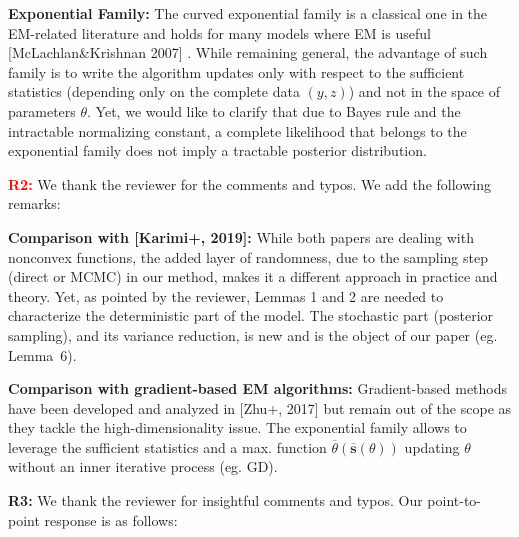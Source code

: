 \documentclass{article}
\begin{document}
\textbf{Exponential Family:} 
The curved exponential family is a classical one in the EM-related literature and holds for many models where  EM is useful [McLachlan\&Krishnan 2007] . 
While remaining general, the advantage of such family is to write the algorithm updates only with respect to the sufficient statistics (depending only on the complete data $(y,z)$) and not in the space of parameters $\theta$. 
Yet, we would like to clarify that due to Bayes rule and the intractable normalizing constant, a complete likelihood that belongs to the exponential family does not imply a tractable posterior distribution.


\textbf{\textcolor{red}{R2:}} We thank the reviewer for the comments and typos. We add the following remarks:\vspace{-5pt}

\textbf{Comparison with [Karimi+, 2019]:} 
While both papers are dealing with nonconvex functions, the added layer of randomness, due to the sampling step (direct or MCMC) in our method, makes it a different approach in practice and theory.
Yet, as pointed by the reviewer, Lemmas 1 and 2 are needed to characterize the deterministic part of the model. 
The stochastic part (posterior sampling), and its variance reduction, is new and is the object of our paper (eg. Lemma~6).\vspace{-5pt}

\textbf{Comparison with gradient-based EM algorithms:} 
Gradient-based methods have been developed and analyzed in [Zhu+, 2017] but remain out of the scope as they tackle the high-dimensionality issue. 
The exponential family allows to leverage the sufficient statistics and a max. function $ \overline{\theta}( \overline{\textbf{s}}(\theta) )$ updating $\theta$ without an inner iterative process (eg. GD).


\textbf{\textcolor{green!50!black}{R3:}} We thank the reviewer for insightful comments and typos. Our point-to-point response is as follows:\vspace{-5pt}
\end{document}
